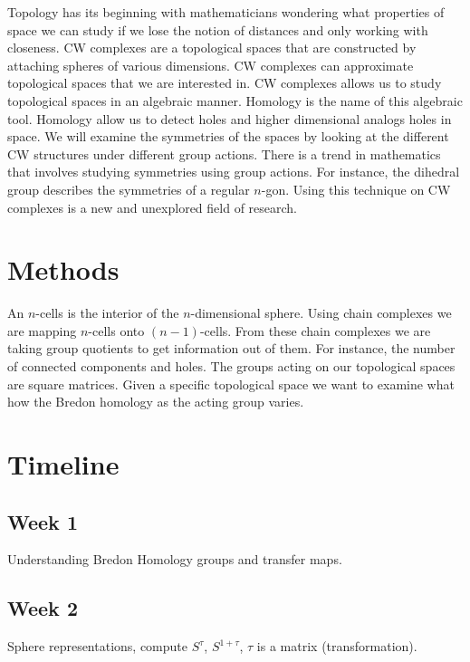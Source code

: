 \documentclass[12pt]{article}
\begin{document}
Topology has its beginning with mathematicians wondering what properties of space we can study if we lose the notion of distances and only working with closeness.\newline
CW complexes are a topological spaces that are constructed by attaching spheres of various dimensions. CW complexes can approximate topological spaces that we are interested in. CW complexes allows us to study topological spaces in an algebraic manner. Homology is the name of this algebraic tool. Homology allow us to detect holes and higher dimensional analogs holes in space.\newline
We will examine the symmetries of the spaces by looking at the different CW structures under different group actions. There is a trend in mathematics that involves studying symmetries using group actions. For instance, the dihedral group describes the symmetries of a regular $n$-gon. Using this technique on CW complexes is a new and unexplored field of research. 

\section{Methods}
An $n$-cells is the interior of the $n$-dimensional sphere. Using chain complexes we are mapping $n$-cells onto $(n-1)$-cells. From these chain complexes we are taking group quotients to get information out of them. For instance, the number of connected components and holes.\newline
The groups acting on our topological spaces are square matrices. Given a specific topological space we want to examine what how the Bredon homology as the acting group varies.\newline

\section{Timeline}
\subsection{Week 1}
Understanding Bredon Homology groups and transfer maps.

\subsection{Week 2}
Sphere representations, compute $S^{\tau}$, $S^{1+\tau}$, $\tau$ is a matrix (transformation).
\end{document}
